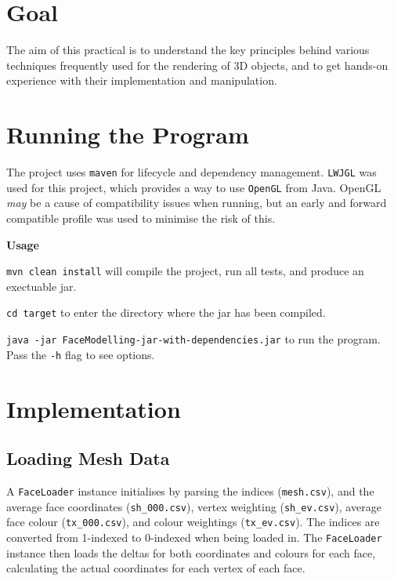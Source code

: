 \documentclass[12pt]{article}
\begin{document}
\begin{titlepage}

\vfill %

\end{titlepage}

\section*{Goal}

The aim of this practical is to understand the key principles behind various techniques
frequently used for the rendering of 3D objects, and to get hands-on experience with their implementation and manipulation.

\setcounter{page}{1} 

\section{Running the Program}

The project uses \texttt{maven} for lifecycle and dependency management.
\texttt{LWJGL} was used for this project, which provides a way to use \texttt{OpenGL} from Java. 
OpenGL \textit{may} be a cause of compatibility issues when running, but an early and forward compatible profile was used to minimise the risk of this.

\bigskip
\noindent\textbf{Usage} 

\noindent\texttt{mvn clean install} will compile the project, run all tests, and produce an exectuable jar.

\noindent\texttt{cd target} to enter the directory where the jar has been compiled.

\noindent \texttt{java -jar FaceModelling-jar-with-dependencies.jar} to run the program. Pass the \texttt{-h} flag to see options.

\section{Implementation}

\subsection{Loading Mesh Data}

A \texttt{FaceLoader} instance initialises by parsing the indices (\texttt{mesh.csv}), and the average face coordinates (\texttt{sh\_000.csv}), vertex weighting (\texttt{sh\_ev.csv}), average face colour (\texttt{tx\_000.csv}), and colour weightings (\texttt{tx\_ev.csv}).
The indices are converted from 1-indexed to 0-indexed when being loaded in.
The \texttt{FaceLoader} instance then loads the deltas for both coordinates and colours for each face, calculating the actual coordinates for each vertex of each face.
\end{document}
